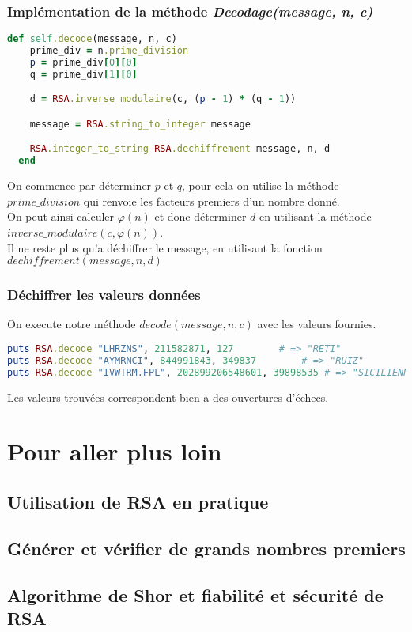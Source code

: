 \documentclass[a4paper,10pt]{article}
\begin{document}
\clearpage
\subsubsection{Implémentation de la méthode \textit{Decodage(message, n, c)}}
\begin{lstlisting}[language=Ruby]
  def self.decode(message, n, c)
    prime_div = n.prime_division
    p = prime_div[0][0]
    q = prime_div[1][0]

    d = RSA.inverse_modulaire(c, (p - 1) * (q - 1))

    message = RSA.string_to_integer message

    RSA.integer_to_string RSA.dechiffrement message, n, d
  end
\end{lstlisting}
On commence par déterminer $p$ et $q$, pour cela on utilise la méthode $prime\_division$ qui renvoie les facteurs premiers d'un nombre donné.\\
On peut ainsi calculer $\varphi(n)$ et donc déterminer $d$ en utilisant la méthode $inverse\_modulaire(c, \varphi(n))$.\\
Il ne reste plus qu'a déchiffrer le message, en utilisant la fonction $dechiffrement(message, n, d)$

\subsubsection{Déchiffrer les valeurs données}
On execute notre méthode $decode(message, n, c)$ avec les valeurs fournies.
\begin{lstlisting}[language=Ruby]
puts RSA.decode "LHRZNS", 211582871, 127		# => "RETI"
puts RSA.decode "AYMRNCI", 844991843, 349837		# => "RUIZ"
puts RSA.decode "IVWTRM.FPL", 202899206548601, 39898535	# => "SICILIENNE"
\end{lstlisting}
Les valeurs trouvées correspondent bien a des ouvertures d'échecs.

\clearpage
\section{Pour aller plus loin}
\subsection{Utilisation de RSA en pratique}
\subsection{Générer et vérifier de grands nombres premiers}
\subsection{Algorithme de Shor et fiabilité et sécurité de RSA}
\end{document}

